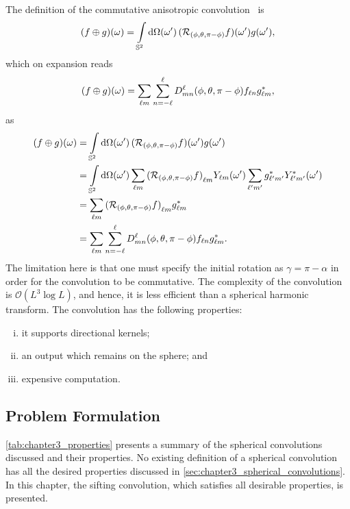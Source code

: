 The definition of the commutative anisotropic convolution~\cite{Sadeghi2012,Khalid2012} is
%
\begin{equation}
	\pixel{(f \oplus g)}
	= \integrateSphere{\omega'} \pixel[']{(\rotation{(\phi,\theta,\pi-\phi)}f)} \pixel[']{g},
\end{equation}
%
which on expansion reads
%
\begin{equation}
	\pixel{(f \oplus g)}
	= \harmonicSum \sum\limits_{n=-\ell}^{\ell} \wigner{\ell}{m}{n}(\phi,\theta,\pi-\phi) f_{\ell n} \conj{\harmonic{g}},
\end{equation}
%
as
%
\begin{align}
	\pixel{(f \oplus g)}
	 & = \integrateSphere{\omega'} \pixel[']{(\rotation{(\phi,\theta,\pi-\phi)}f)} \pixel[']{g} \nonumber{}                                                                                                  \\
	 & = \integrateSphere{\omega'} \harmonicSum \harmonic{(\rotation{(\phi,\theta,\pi-\phi)}f)} \pixel[']{\harmonic{Y}} \harmonicSum['] \conj{\harmonic[']{g}} \pixel[']{\conj{\harmonic[']{Y}}} \nonumber{} \\
	 & = \harmonicSum \harmonic{(\rotation{(\phi,\theta,\pi-\phi)}f)} \conj{\harmonic{g}} \nonumber{}                                                                                                        \\
	 & = \harmonicSum \sum\limits_{n=-\ell}^{\ell} \wigner{\ell}{m}{n}(\phi,\theta,\pi-\phi) f_{\ell n} \conj{\harmonic{g}}.
\end{align}
%
The limitation here is that one must specify the initial rotation as \({\gamma=\pi-\alpha}\) in order for the convolution to be commutative.
The complexity of the convolution is \(\mathcal{O}(L^{3}\log{L})\), and hence, it is less efficient than a spherical harmonic transform.
The convolution has the following properties:
%
\begin{enumerate}[(i),nosep,left=\parindent]
	\item it supports directional kernels;
	\item an output which remains on the sphere; and
	\item expensive computation.
\end{enumerate}

\subsection{Problem Formulation}

\cref{tab:chapter3_properties} presents a summary of the spherical convolutions discussed and their properties.
No existing definition of a spherical convolution has all the desired properties discussed in \cref{sec:chapter3_spherical_convolutions}.
In this chapter, the sifting convolution, which satisfies all desirable properties, is presented.


